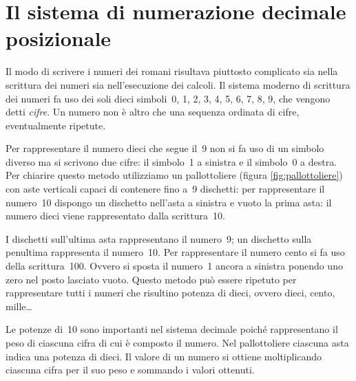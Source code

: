 \section{Il sistema di numerazione decimale posizionale}
\label{sec:nat_sist10}

Il modo di scrivere i numeri dei romani risultava piuttosto complicato sia 
nella scrittura dei numeri sia nell'esecuzione dei calcoli. 
Il sistema moderno di scrittura dei numeri fa uso dei soli dieci 
simboli~0, 1, 2, 3, 4, 5, 6, 7, 8, 9, che vengono detti \emph{cifre}.
Un numero non è altro che una sequenza ordinata di cifre, eventualmente 
ripetute.

Per rappresentare il numero dieci che segue il~9 non si fa uso di un 
simbolo diverso ma si scrivono due cifre: il simbolo~1 a sinistra e il 
simbolo~0 a destra. 
Per chiarire questo metodo utilizziamo un pallottoliere 
(figura \ref{fig:pallottoliere}) con aste verticali capaci di contenere 
fino a~9 dischetti: per rappresentare il numero~10 dispongo un dischetto 
nell'asta a sinistra e vuoto la prima asta: 
il numero dieci viene rappresentato dalla scrittura~10.

% 



I dischetti sull'ultima asta rappresentano il numero~9; un dischetto sulla 
penultima rappresenta il numero~10. 
Per rappresentare il numero cento si fa uso della scrittura~100.
Ovvero si sposta il numero~1 ancora a sinistra ponendo uno zero nel posto 
lasciato vuoto.
Questo metodo può essere ripetuto per rappresentare tutti i numeri che 
risultino potenza di dieci, ovvero dieci, cento, mille\ldots

Le potenze di~10 sono importanti nel sistema decimale poiché rappresentano 
il peso di ciascuna cifra di cui è composto il numero. 
Nel pallottoliere ciascuna asta indica una potenza di dieci. 
Il valore di un numero si ottiene moltiplicando ciascuna cifra per il
suo peso e sommando i valori ottenuti.


